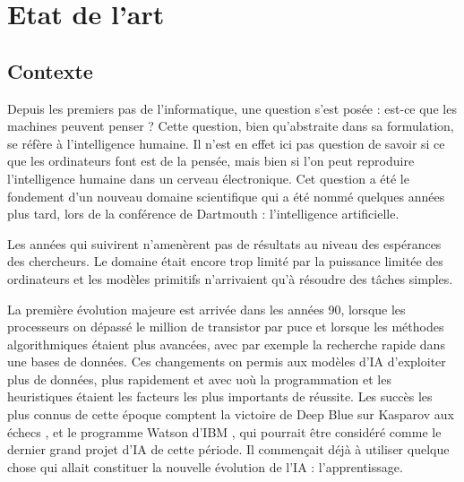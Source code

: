 \chapter{Etat de l'art}
	\minitoc
	\newpage






\section{Contexte}

	Depuis les premiers pas de l'informatique, une question s'est posée : est-ce que les machines peuvent penser ? \cite{turing1950computing} Cette question, bien qu'abstraite dans sa formulation, se réfère à l'intelligence humaine. Il n'est en effet ici pas question de savoir si ce que les ordinateurs font est de la pensée, mais bien si l'on peut reproduire l'intelligence humaine dans un cerveau électronique. Cet question a été le fondement d'un nouveau domaine scientifique qui a été nommé quelques années plus tard, lors de la conférence de Dartmouth \cite{mccarthy1955proposal} : l'intelligence artificielle.

	Les années qui suivirent n'amenèrent pas de résultats au niveau des espérances des chercheurs. Le domaine était encore trop limité par la puissance limitée des ordinateurs et les modèles primitifs n'arrivaient qu'à résoudre des tâches simples.

	La première évolution majeure est arrivée dans les années 90, lorsque les processeurs on dépassé le million de transistor par puce et lorsque les méthodes algorithmiques étaient plus avancées, avec par exemple la recherche rapide dans une bases de données. Ces changements on permis aux modèles d'IA d'exploiter plus de données, plus rapidement et avec uoù la programmation et les heuristiques étaient les facteurs les plus importants de réussite. Les succès les plus connus de cette époque comptent la victoire de Deep Blue sur Kasparov aux échecs \cite{campbell2002deep}, et le programme Watson d'IBM \cite{ferrucci2012introduction}, qui pourrait être considéré comme le dernier grand projet d'IA de cette période. Il commençait déjà à utiliser quelque chose qui allait constituer la nouvelle évolution de l'IA : l'apprentissage.

